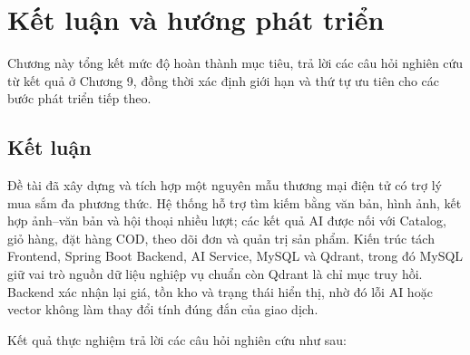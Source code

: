 
\section{Kết luận và hướng phát triển}

Chương này tổng kết mức độ hoàn thành mục tiêu, trả lời các câu hỏi nghiên cứu từ kết quả ở Chương 9, đồng thời xác định giới hạn và thứ tự ưu tiên cho các bước phát triển tiếp theo.

\subsection{Kết luận}

Đề tài đã xây dựng và tích hợp một nguyên mẫu thương mại điện tử có trợ lý mua sắm đa phương thức. Hệ thống hỗ trợ tìm kiếm bằng văn bản, hình ảnh, kết hợp ảnh--văn bản và hội thoại nhiều lượt; các kết quả AI được nối với Catalog, giỏ hàng, đặt hàng COD, theo dõi đơn và quản trị sản phẩm. Kiến trúc tách Frontend, Spring Boot Backend, AI Service, MySQL và Qdrant, trong đó MySQL giữ vai trò nguồn dữ liệu nghiệp vụ chuẩn còn Qdrant là chỉ mục truy hồi. Backend xác nhận lại giá, tồn kho và trạng thái hiển thị, nhờ đó lỗi AI hoặc vector không làm thay đổi tính đúng đắn của giao dịch.

Kết quả thực nghiệm trả lời các câu hỏi nghiên cứu như sau:


